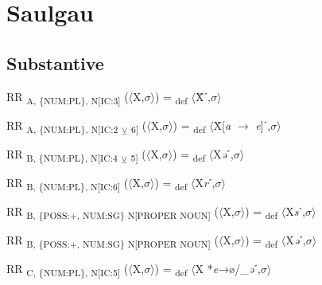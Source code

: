 {\section{Saulgau}

\subsection{Substantive}

\begin{exe}
 RR \textsubscript{A, \{NUM:PL\}, N[IC:3]} ($\langle$X,$\sigma $$\rangle$) = \textsubscript{def} $\langle$Ẍˊ,$\sigma $$\rangle$
\end{exe}

\begin{exe}
 RR \textsubscript{A, \{NUM:PL\}, N[IC:2} \textsubscript{${\veebar}$}\textsubscript{ 6]} ($\langle$X,$\sigma $$\rangle$) = \textsubscript{def} $\langle$Ẍ[\textit{a} $\rightarrow$ \textit{e}]ˊ,$\sigma $$\rangle$
\end{exe}

\begin{exe}
 RR \textsubscript{B, \{NUM:PL\}, N[IC:4} \textsubscript{${\veebar}$}\textsubscript{ 5]} ($\langle$X,$\sigma $$\rangle$) = \textsubscript{def} $\langle$X\textit{ə}ˊ,$\sigma $$\rangle$
\end{exe}

\begin{exe}
 RR \textsubscript{B, \{NUM:PL\}, N[IC:6]} ($\langle$X,$\sigma $$\rangle$) = \textsubscript{def} $\langle$X\textit{r}ˊ,$\sigma $$\rangle$
\end{exe}

\begin{exe}
 RR \textsubscript{B, \{POSS:+, NUM:SG\} N[}\textsubscript{PROPER NOUN}\textsubscript{]} ($\langle$X,$\sigma $$\rangle$) = \textsubscript{def} $\langle$X\textit{s}ˊ,$\sigma $$\rangle$
\end{exe}

\begin{exe}
 RR \textsubscript{B, \{POSS:+, NUM:SG\} N[}\textsubscript{PROPER NOUN}\textsubscript{]} ($\langle$X,$\sigma $$\rangle$) = \textsubscript{def} $\langle$X\textit{ə}ˊ,$\sigma $$\rangle$
\end{exe}

\begin{exe}
 RR \textsubscript{C, \{NUM:PL\}, N[IC:5]} ($\langle$X,$\sigma $$\rangle$) = \textsubscript{def} $\langle$X *\textit{e}→ø/\_\textit{ə}ˊ,$\sigma $$\rangle$
\end{exe}

}
